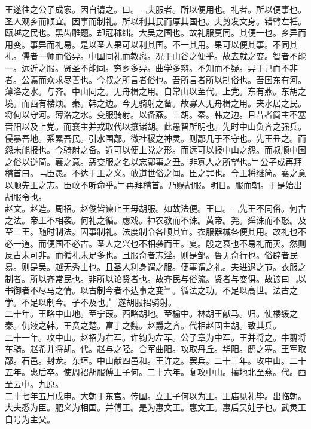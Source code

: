 \documentclass{zhvt-classic}
\begin{document}
\hspace*{2em}王遂往之公子成家。因自请之。曰。﹁夫服者。所以便用也。礼者。所以便事也。圣人观乡而顺宜。因事而制礼。所以利其民而厚其国也。夫剪发文身。错臂左衽。瓯越之民也。黑齿雕题。却冠秫绌。大吴之国也。故礼服莫同。其便一也。乡异而用变。事异而礼易。是以圣人果可以利其国。不一其用。果可以便其事。不同其礼。儒者一师而俗异。中国同礼而教离。况于山谷之便乎。故去就之变。智者不能一。远近之服。贤圣不能同。穷乡多异。曲学多辩。不知而不疑。异于己而不非者。公焉而众求尽善也。今叔之所言者俗也。吾所言者所以制俗也。吾国东有河。薄洛之水。与齐。中山同之。无舟楫之用。自常山以至代。上党。东有燕。东胡之境。而西有楼烦。秦。韩之边。今无骑射之备。故寡人无舟楫之用。夹水居之民。将何以守河。薄洛之水。变服骑射。以备燕。三胡。秦。韩之边。且昔者简主不塞晋阳以及上党。而襄主并戎取代以攘诸胡。此愚智所明也。先时中山负齐之强兵。侵暴吾地。系累吾民。引水围鄗。微社稷之神灵。则鄗几于不守也。先王丑之。而怨未能报也。今骑射之备。近可以便上党之形。而远可以报中山之怨。而叔顺中国之俗以逆简。襄之意。恶变服之名以忘鄗事之丑。非寡人之所望也。﹂公子成再拜稽首曰。﹁臣愚。不达于王之义。敢道世俗之闻。臣之罪也。今王将继简。襄之意以顺先王之志。臣敢不听命乎。﹂再拜稽首。乃赐胡服。明日。服而朝。于是始出胡服令也。\\
\hspace*{2em}赵文。赵造。周袑。赵俊皆谏止王毋胡服。如故法便。王曰。﹁先王不同俗。何古之法。帝王不相袭。何礼之循。虙戏。神农教而不诛。黄帝。尧。舜诛而不怒。及至三王。随时制法。因事制礼。法度制令各顺其宜。衣服器械各便其用。故礼也不必一道。而便国不必古。圣人之兴也不相袭而王。夏。殷之衰也不易礼而灭。然则反古未可非。而循礼未足多也。且服奇者志淫。则是邹。鲁无奇行也。俗辟者民易。则是吴。越无秀士也。且圣人利身谓之服。便事谓之礼。夫进退之节。衣服之制者。所以齐常民也。非所以论贤者也。故齐民与俗流。贤者与变俱。故谚曰﹃以书御者不尽马之情。以古制今者不达事之变﹄。循法之功。不足以高世。法古之学。不足以制今。子不及也。﹂遂胡服招骑射。\\
\hspace*{2em}二十年。王略中山地。至宁葭。西略胡地。至榆中。林胡王献马。归。使楼缓之秦。仇液之韩。王贲之楚。富丁之魏。赵爵之齐。代相赵固主胡。致其兵。\\
\hspace*{2em}二十一年。攻中山。赵袑为右军。许钧为左军。公子章为中军。王并将之。牛翦将车骑。赵希并将胡。代。赵与之陉。合军曲阳。攻取丹丘。华阳。鸱之塞。王军取鄗。石邑。封龙。东垣。中山献四邑和。王许之。罢兵。二十三年。攻中山。二十五年。惠后卒。使周袑胡服傅王子何。二十六年。复攻中山。攘地北至燕。代。西至云中。九原。\\
\hspace*{2em}二十七年五月戊申。大朝于东宫。传国。立王子何以为王。王庙见礼毕。出临朝。大夫悉为臣。肥义为相国。并傅王。是为惠文王。惠文王。惠后吴娃子也。武灵王自号为主父。\\
\end{document}
